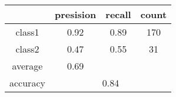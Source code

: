 
    \begin{tabular}{ | c | c | c | c | }
	\hline
	         &presision & recall & count \\ \hline
	class1   & 0.92    & 0.89  & 170 \\ \hline
	class2   & 0.47    & 0.55  & 31 \\ \hline
	average  & 0.69    &        &       \\
	\hline
	accuracy & \multicolumn{3}{c|}{0.84}\\
	\hline
    \end{tabular}